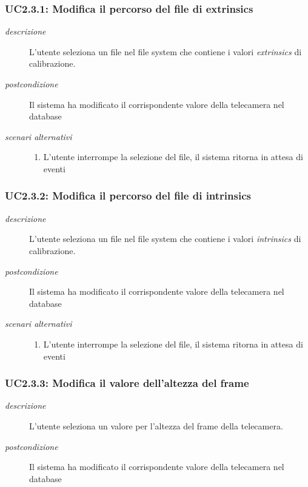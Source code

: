 \subsubsection{UC2.3.1: Modifica il percorso del file di extrinsics} \label{sec:UC2.3.1}
\begin{description}
\item[\em{descrizione }]L'utente seleziona un file nel file system che contiene i valori \textit{extrinsics} di calibrazione.
\item[\em{postcondizione }] Il sistema ha modificato il corrispondente valore della telecamera nel database
\item[\em{scenari alternativi }] \mbox{} 
\begin{enumerate} 
\item L'utente interrompe la selezione del file, il sistema ritorna in attesa di eventi
\end{enumerate}
\end{description}

\subsubsection{UC2.3.2: Modifica il percorso del file di intrinsics} \label{sec:UC2.3.2}
\begin{description}
\item[\em{descrizione }]L'utente seleziona un file nel file system che contiene i valori \textit{intrinsics} di calibrazione.
\item[\em{postcondizione }] Il sistema ha modificato il corrispondente valore della telecamera nel database
\item[\em{scenari alternativi }] \mbox{} 
\begin{enumerate} 
\item L'utente interrompe la selezione del file, il sistema ritorna in attesa di eventi
\end{enumerate}
\end{description}

\subsubsection{UC2.3.3: Modifica il valore dell'altezza del frame} \label{sec:UC2.3.3}
\begin{description}
\item[\em{descrizione }]L'utente seleziona un valore per l'altezza del frame della telecamera.
\item[\em{postcondizione }] Il sistema ha modificato il corrispondente valore della telecamera nel database
\end{description}

